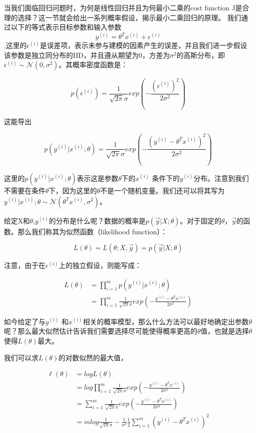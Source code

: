 \documentclass[UTF8]{ctexart}
\begin{document}
当我们面临回归问题时，为何是线性回归并且为何最小二乘的cost function J是合理的选择？这一节就会给出一系列概率假设，揭示最小二乘回归的原理。
我们通过以下的等式表示目标参数和输入参数\[y^{(i)} =\theta^{T} x^{(i)} + \epsilon^{(i)}\],这里的$\epsilon^{(i)}$是误差项，表示未参与建模的因素产生的误差，并且我们进一步假设该参数是独立同分布的IID，并且遵从期望为0，方差为$\sigma^{2}$的高斯分布，即$\epsilon^{(i)} \sim \mathcal{N}(0,\sigma^{2})$。其概率密度函数是：

\[p(\epsilon^{(i)})=\frac{1}{\sqrt{2\pi}\sigma}exp(-\frac{(\epsilon^{(i)})^{2}}{2\sigma^{2}})\]

这能导出

\[p(y^{(i)}|x^{(i)};\theta)=\frac{1}{\sqrt{2\pi}\sigma}exp(-\frac{(y^{(i)} - \theta^{T} x^{(i)})^{2}}{2\sigma^{2}})\]

这里的$p(y^{(i)}|x^{(i)};\theta)$表示这是参数$\theta$下的$x^{(i)}$ 条件下的$y^{(i)}$分布。注意到我们不需要在条件$\theta$下，因为这里的$\theta$不是一个随机变量。我们还可以将其写为$y^{(i)}|x^{(i)};\theta \sim \mathcal{N}(\theta^{T}x^{(i)},\sigma^{2})$。

给定X和$\theta$,$y^{(i)}$的分布是什么呢？数据的概率是$p(\vec{y}|X;\theta)$。对于固定的$\theta$，$\vec{y}$的函数。那么我们称其为似然函数（likelihood function）：

\[ L(\theta) = L(\theta;X,\vec{y}) = p(\vec{y}|X;\theta) \]

注意，由于在$\epsilon^{(i)}$上的独立假设，则能写成： 

\begin{align*}
L(\theta) & = \prod_{i=1}^{m}p(y^{(i)}|x^{(i)};\theta)\\
& = \prod_{i=1}^{m}{\frac{1}{\sqrt{2\pi}\sigma} exp(-\frac{y^{(i)} - \theta^{T} x^{(i)}}{2\sigma^{2}})}
\end{align*}

如今给定了与$y^{(i)}$ 和$x^{(i)}$相关的概率模型，那么什么方法可以最好地确定出参数$\theta$呢？那么最大似然估计告诉我们需要选择尽可能使得概率更高的$\theta$值，也就是选择$\theta$使得$L(\theta) $最大。

我们可以求$L(\theta) $的对数似然的最大值，


\begin{align*}
\ell(\theta) & = logL(\theta)\\
& =log  \prod_{i=1}^{m}{\frac{1}{\sqrt{2\pi}\sigma} }exp(-\frac{y^{(i)} - \theta^{T} x^{(i)}}{2\sigma^{2}}) \\
& = \sum_{i=1}^{m} {\frac{1}{\sqrt{2\pi}\sigma} exp(-\frac{y^{(i)} - \theta^{T} x^{(i)}}{2\sigma^{2}})} \\
& = m log \frac{1}{\sqrt{2\pi}\sigma} - \frac{1}{\sigma^{2}} \frac{1}{2} \sum_{i=1}^{m}{(y^{(i)}-\theta^{T}x^{(i)})^2}
\end{align*}
\end{document}

